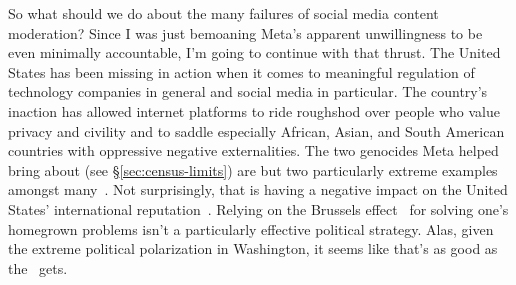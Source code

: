 So what should we do about the many failures of social media content moderation?
Since I was just bemoaning Meta's apparent unwillingness to be even minimally
accountable, I'm going to continue with that thrust. The United States has been
missing in action when it comes to meaningful regulation of technology companies
in general and social media in particular. The country's inaction has allowed
internet platforms to ride roughshod over people who value privacy and civility
and to saddle especially African, Asian, and South American countries with
oppressive negative externalities. The two genocides Meta helped bring about
(see \S\ref{sec:census-limits}) are but two particularly extreme examples
amongst
many~\cite{DwoskinNewmyerea2021,ElliottChristopherea2021a,FrenkelAlba2021,Iyengar2021,MacSilverman2020,Morris2021,Newton2021,Satariano2021,Scott2021,SilvermanMacea2020,Simonite2021,WongEllisPetersen2021,WongErnst2021,WongHarding2021,ZahrzewskiDeVynckea2021}.
Not surprisingly, that is having a negative impact on the United States'
international reputation~\cite{GeltzerGhosh2018}. Relying on the Brussels
effect~\cite{Bradford2020} for solving one's homegrown problems isn't a
particularly effective political strategy. Alas, given the extreme political
polarization in Washington, it seems like that's as good as the \US\ gets.

